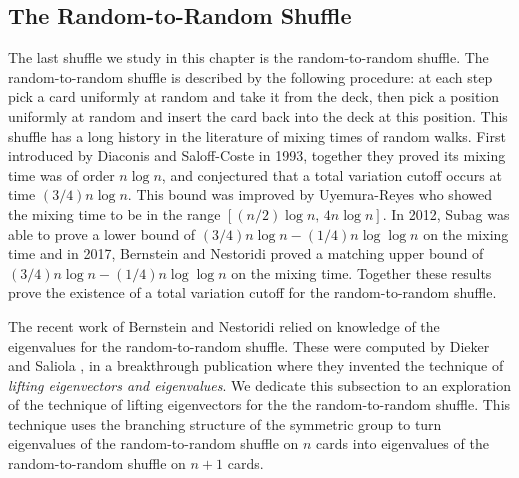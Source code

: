 \documentclass[11pt]{report}
\begin{document}
\subsection{The Random-to-Random Shuffle}
\label{chpt4:subsec:rtr}
The last shuffle we study in this chapter is the random-to-random shuffle. The random-to-random shuffle is described by the following procedure: at each step pick a card uniformly at random and take it from the deck, then pick a position uniformly at random and insert the card back into the deck at this position. 	This 
shuffle has a long history in the literature of mixing times of random 
walks. 	First introduced by Diaconis and Saloff-Coste 
\cite{diaconis1993comparison} in 1993, together they proved its mixing time was of  order  $n\log n$, and conjectured that a total variation cutoff occurs at time $(3/4)n\log n$.	This bound was improved by Uyemura-Reyes 
\cite{uyemura2002random} who showed the mixing time to be in the range $[(n/2)\log n, \,4n\log n]$. In 2012, Subag \cite{subag2013lower} was able to prove a lower bound of $(3/4)n\log n -(1/4) n\log \log n$ on the mixing time and in 2017, Bernstein and Nestoridi \cite{Bernstein2017} proved a matching upper bound of $(3/4)n\log n -(1/4)n\log \log n$ on the mixing time. Together these results prove the existence of a total variation cutoff for the random-to-random shuffle.










The recent work of Bernstein and Nestoridi \cite{Bernstein2017} relied on knowledge of the eigenvalues for the 
random-to-random shuffle. These were computed by Dieker and Saliola 
\cite{dieker2018spectral}, in a breakthrough publication where they 
invented the technique of \emph{lifting eigenvectors and eigenvalues}.  We 
dedicate this subsection to an exploration of the technique of lifting eigenvectors for the the random-to-random shuffle.
This technique uses the branching structure of the symmetric group to turn eigenvalues of the random-to-random shuffle on $n$ cards into eigenvalues of the random-to-random shuffle on $n+1$ cards. 
\end{document}
